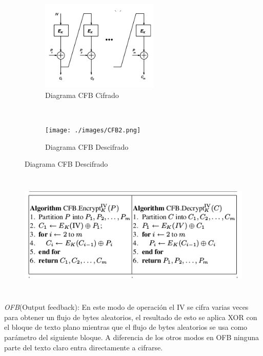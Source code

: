 \begin{figure}[h]
    \centering
    \begin{subfigure}[t]{0.5\textwidth}
        \centering
        \includegraphics[height=1.7in]{./images/cfb1.png}
		\caption{Diagrama CFB Cifrado}
		\label{fig:1-5-1}
    \end{subfigure}%
    ~ 
    \begin{subfigure}[t]{0.5\textwidth}
        \centering
        \texttt{[image: ./images/CFB2.png]}
		\caption{Diagrama CFB Descifrado}
		\label{fig:1-5-1}
    \end{subfigure}
    \label{fig:protocol}
\end{figure}

\begin{figure}[H]
\centering
	\includegraphics[width=14cm, height=6cm]{./images/pcfb.png}
	
\end{figure}


\textit{OFB}(Output feedback): En este modo de operación el IV se cifra varias veces para obtener un flujo de bytes aleatorios, el resultado de esto se aplica XOR con el bloque de texto plano mientras que el flujo de bytes aleatorios se usa como parámetro del siguiente bloque. A diferencia de los otros modos en OFB ninguna parte del texto claro entra directamente a cifrarse.

